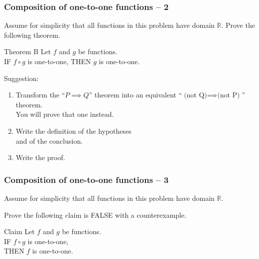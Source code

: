 \begin{frame}[t]
	\frametitle{Composition of one-to-one functions -- 2}

	Assume for simplicity that all functions in this problem have domain
	$\mathbb{R}$. Prove the following theorem.

	\begin{block}{Theorem B}
		Let $f$ and $g$ be functions. \\ IF $f \circ g$ is one-to-one, \quad THEN $g$
		is one-to-one.
	\end{block}

	Suggestion:
	\begin{enumerate}
		\item Transform the ``$\displaystyle P \implies Q$'' theorem into an equivalent
			``$\displaystyle \text{(not Q)}\implies \text{(not P)}$'' theorem. \\ You
			will prove that one instead.

		\item Write the definition of the hypotheses \\ and of the conclusion.

		\item Write the proof.
	\end{enumerate}
\end{frame}

\begin{frame}[t]
	\frametitle{Composition of one-to-one functions -- 3}

	Assume for simplicity that all functions in this problem have domain
	$\mathbb{R}$.

	\vfill

	Prove the following claim is FALSE with a counterexample.

	\vfill

	\begin{block}{Claim }
		Let $f$ and $g$ be functions. \\ IF $f \circ g$ is one-to-one, \\ THEN $f$ is
		one-to-one.
	\end{block}

	\vfill
\end{frame}

